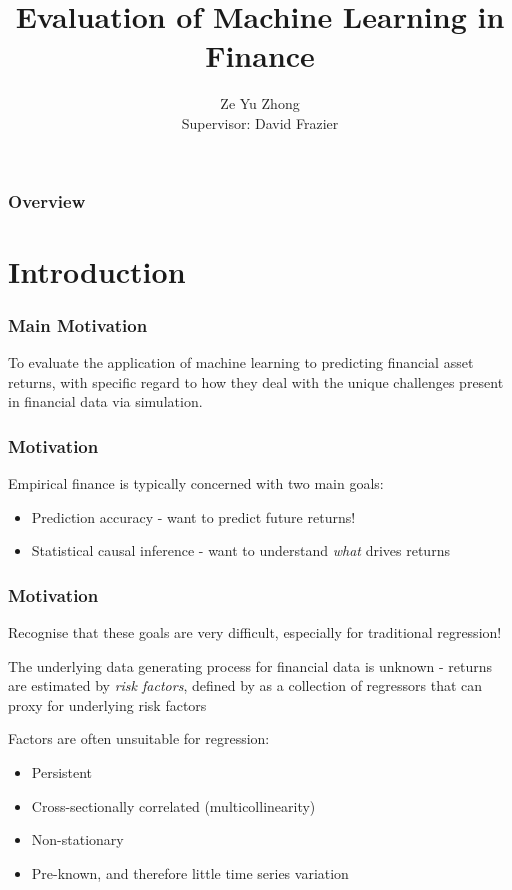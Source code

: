 \documentclass[aspectratio=169]{beamer}
\title{Evaluation of Machine Learning in Finance}
\author{Ze Yu Zhong 
	\\ Supervisor: David Frazier}
\institute{Monash University}
\date{}
\begin{document}
	
\begin{frame}[plain]
    \maketitle
\end{frame}

\begin{frame}
\frametitle{Overview}
\tableofcontents
\end{frame}

\section{Introduction}


\begin{frame}
\frametitle{Main Motivation}
To evaluate the application of machine learning to predicting financial asset returns, with specific regard to how they deal with the unique challenges present in financial data via simulation.
\end{frame}

\begin{frame}
\frametitle{Motivation}
Empirical finance is typically concerned with two main goals:
\begin{itemize}
	\item Prediction accuracy - want to predict future returns!
	\item Statistical causal inference - want to understand \textit{what} drives returns
\end{itemize}
\end{frame}

\begin{frame}
\frametitle{Motivation}
Recognise that these goals are very difficult, especially for traditional regression!

The underlying data generating process for financial data is unknown - returns are estimated by \textit{risk factors}, defined by \cite{harvey__2016} as a collection of regressors that can proxy for underlying risk factors

Factors are often unsuitable for regression:
\begin{itemize}
	\item Persistent
	\item Cross-sectionally correlated (multicollinearity)
	\item Non-stationary
	\item Pre-known, and therefore little time series variation
\end{itemize}
\end{frame}
\end{document}
